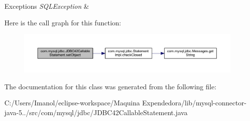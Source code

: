 \begin{DoxyExceptions}{Exceptions}
{\em S\+Q\+L\+Exception} & \\
\hline
\end{DoxyExceptions}
Here is the call graph for this function\+:
\nopagebreak
\begin{figure}[H]
\begin{center}
\leavevmode
\includegraphics[width=350pt]{classcom_1_1mysql_1_1jdbc_1_1_j_d_b_c42_callable_statement_a51432b05b2c20b2c5f8d2f81ea3b3560_cgraph}
\end{center}
\end{figure}


The documentation for this class was generated from the following file\+:\begin{DoxyCompactItemize}
\item 
C\+:/\+Users/\+Imanol/eclipse-\/workspace/\+Maquina Expendedora/lib/mysql-\/connector-\/java-\/5../src/com/mysql/jdbc/J\+D\+B\+C42\+Callable\+Statement.\+java\end{DoxyCompactItemize}
